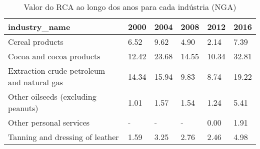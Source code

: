 \begin{table}
\centering
\caption{Valor do RCA ao longo dos anos para cada indústria (NGA)}
\begin{tabular}{p{6cm}p{1.5cm}p{1.5cm}p{1.5cm}p{1.5cm}p{1.5cm}}
\toprule
                             industry\_name &  2000 &  2004 &  2008 &  2012 &  2016 \\
\midrule
                           Cereal products &  6.52 &  9.62 &  4.90 &  2.14 &  7.39 \\
                  Cocoa and cocoa products & 12.42 & 23.68 & 14.55 & 10.34 & 32.81 \\
Extraction crude petroleum and natural gas & 14.34 & 15.94 &  9.83 &  8.74 & 19.22 \\
        Other oilseeds (excluding peanuts) &  1.01 &  1.57 &  1.54 &  1.24 &  5.41 \\
                   Other personal services &     - &     - &     - &  0.00 &  1.91 \\
           Tanning and dressing of leather &  1.59 &  3.25 &  2.76 &  2.46 &  4.98 \\
\bottomrule
\end{tabular}
\end{table}

